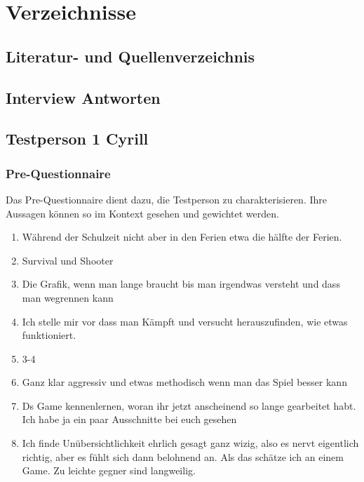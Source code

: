 \documentclass[../Main.tex]{subfiles}
\begin{document}
\section{Verzeichnisse}

\subsection{Literatur- und Quellenverzeichnis}

\printbibliography[heading=none]

\subsection{Interview Antworten}

\subsection{Testperson 1 Cyrill}
\subsubsection{Pre-Questionnaire}
 
Das Pre-Questionnaire dient dazu, die Testperson zu charakterisieren. Ihre Aussagen können so im Kontext gesehen und gewichtet werden.
 
\begin{enumerate}[label=\textbf{P\arabic*}, leftmargin=1.5cm, itemsep=0.5em]
    \item Während der Schulzeit nicht aber in den Ferien etwa die hälfte der Ferien.
    \item Survival und Shooter
    \item Die Grafik, wenn man lange braucht bis man irgendwas versteht und dass man wegrennen kann
    \item Ich stelle mir vor dass man Kämpft und versucht herauszufinden, wie etwas funktioniert.
    \item 3-4
    \item Ganz klar aggressiv und etwas methodisch wenn man das Spiel besser kann
    \item Ds Game kennenlernen, woran ihr jetzt anscheinend so lange gearbeitet habt. Ich habe ja ein paar Ausschnitte bei euch gesehen
    \item Ich finde Unübersichtlichkeit ehrlich gesagt ganz wizig, also es nervt eigentlich richtig, aber es fühlt sich dann belohnend an. Als das schätze ich an einem Game. Zu leichte gegner sind langweilig.
\end{enumerate}
\end{document}

